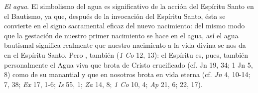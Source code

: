  \emph{El agua}. El simbolismo del agua es significativo de la acción del Espíritu Santo en el Bautismo, ya que, después de la invocación del Espíritu Santo, ésta se convierte en el signo sacramental eficaz del nuevo nacimiento: del mismo modo que la gestación de nuestro primer nacimiento se hace en el agua, así el agua bautismal significa realmente que nuestro nacimiento a la vida divina se nos da en el Espíritu Santo. Pero , también  (\emph{1 Co} 12, 13): el Espíritu es, pues, también personalmente el Agua viva que brota de Cristo crucificado (cf. Jn 19, 34; 1 Jn 5, 8) como de su manantial y que en nosotros brota en vida eterna (cf. \emph{Jn} 4, 10-14; 7, 38; \emph{Ex} 17, 1-6; \emph{Is} 55, 1; \emph{Za} 14, 8; \emph{1 Co} 10, 4; \emph{Ap} 21, 6; 22, 17).